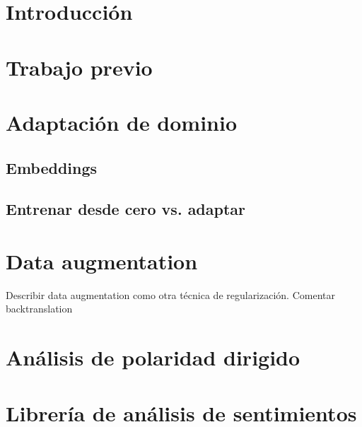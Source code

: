 
\section{Introducción}

\section{Trabajo previo}

\section{Adaptación de dominio}

\subsection{Embeddings}
\subsection{Entrenar desde cero vs. adaptar}

\section{Data augmentation}

Describir data augmentation como otra técnica de regularización. Comentar backtranslation

\section{Análisis de polaridad dirigido}

\section{Librería de análisis de sentimientos}
